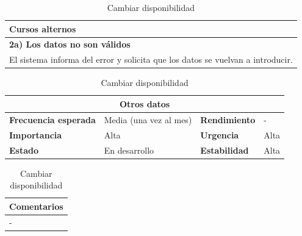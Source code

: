 \documentclass[12pt,spanish]{article}
\begin{document}
\begin{table}[H]
\vspace{1cm}

\begin{tabular}{|m{10pt}|m{7.15cm}|m{10pt}|m{7.15cm}|}
\hline
\multicolumn{4}{|m{16.2cm}|}{\textbf{Cursos alternos}} \\
\hline
\multicolumn{4}{|m{16.2cm}|}{\textbf{2a) Los datos no son válidos}} \\
\hline
\multicolumn{4}{|m{16.2cm}|}{El sistema informa del error y solicita que los datos se vuelvan a introducir.} \\
\hline
\end{tabular}

\vspace{1cm}

\begin{tabular}{|m{3.72cm}|m{3.72cm}|m{3.72cm}|m{3.72cm}|}
\hline
\multicolumn{4}{|c|}{\textbf{Otros datos}} \\
\hline
\textbf{Frecuencia esperada} & Media (una vez al mes) & \textbf{Rendimiento} & - \\
\hline
\textbf{Importancia} & Alta & \textbf{Urgencia} & Alta \\
\hline
\textbf{Estado} & En desarrollo & \textbf{Estabilidad} & Alta \\
\hline
\end{tabular}

\vspace{1cm}

\begin{tabular}{|m{16.2cm}|}
\hline
\textbf{Comentarios} \\
\hline
- \\
\hline
\end{tabular}

\caption{Cambiar disponibilidad}

\end{table}

\end{document}
